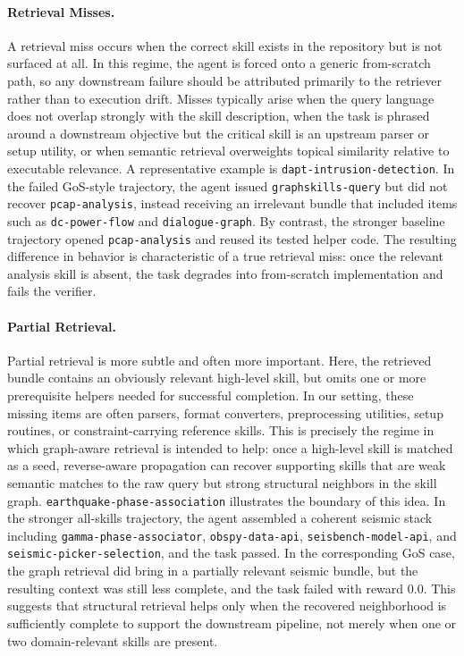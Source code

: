 \paragraph{Retrieval Misses.}
A retrieval miss occurs when the correct skill exists in the repository but is not surfaced at all. In this regime, the agent is forced onto a generic from-scratch path, so any downstream failure should be attributed primarily to the retriever rather than to execution drift. Misses typically arise when the query language does not overlap strongly with the skill description, when the task is phrased around a downstream objective but the critical skill is an upstream parser or setup utility, or when semantic retrieval overweights topical similarity relative to executable relevance. A representative example is \texttt{dapt-intrusion-detection}. In the failed GoS-style trajectory, the agent issued \texttt{graphskills-query} but did not recover \texttt{pcap-analysis}, instead receiving an irrelevant bundle that included items such as \texttt{dc-power-flow} and \texttt{dialogue-graph}. By contrast, the stronger baseline trajectory opened \texttt{pcap-analysis} and reused its tested helper code. The resulting difference in behavior is characteristic of a true retrieval miss: once the relevant analysis skill is absent, the task degrades into from-scratch implementation and fails the verifier.

\paragraph{Partial Retrieval.}
Partial retrieval is more subtle and often more important. Here, the retrieved bundle contains an obviously relevant high-level skill, but omits one or more prerequisite helpers needed for successful completion. In our setting, these missing items are often parsers, format converters, preprocessing utilities, setup routines, or constraint-carrying reference skills. This is precisely the regime in which graph-aware retrieval is intended to help: once a high-level skill is matched as a seed, reverse-aware propagation can recover supporting skills that are weak semantic matches to the raw query but strong structural neighbors in the skill graph. \texttt{earthquake-phase-association} illustrates the boundary of this idea. In the stronger all-skills trajectory, the agent assembled a coherent seismic stack including \texttt{gamma-phase-associator}, \texttt{obspy-data-api}, \texttt{seisbench-model-api}, and \texttt{seismic-picker-selection}, and the task passed. In the corresponding GoS case, the graph retrieval did bring in a partially relevant seismic bundle, but the resulting context was still less complete, and the task failed with reward $0.0$. This suggests that structural retrieval helps only when the recovered neighborhood is sufficiently complete to support the downstream pipeline, not merely when one or two domain-relevant skills are present.

